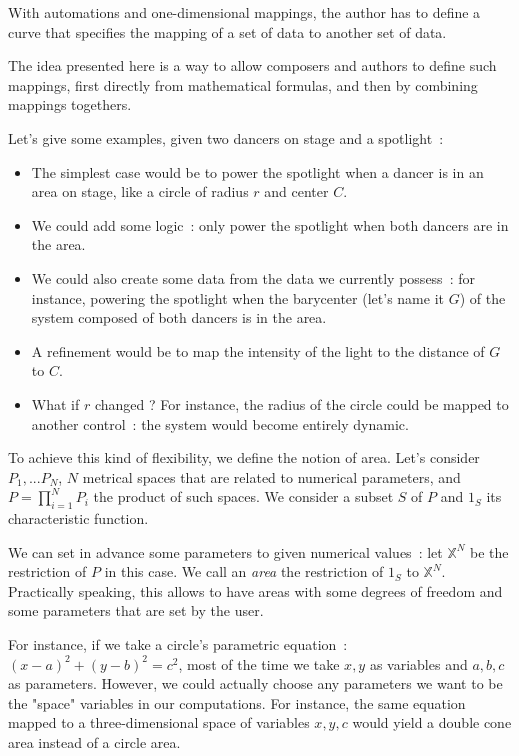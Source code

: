 \documentclass{sigchi}
\begin{document}
With automations and one-dimensional mappings, the author has to define a curve that specifies the mapping of a set of data to another set of data.

The idea presented here is a way to allow composers and authors to define such mappings, first directly from mathematical formulas, and then by combining mappings togethers.

Let's give some examples, given two dancers on stage and a spotlight~: 
\begin{itemize}
	\item The simplest case would be to power the spotlight when a dancer is in an area on stage, like a circle of radius $r$ and center $C$.
	\item We could add some logic~: only power the spotlight when both dancers are in the area.
	\item We could also create some data from the data we currently possess~: for instance, powering the spotlight when the barycenter (let's name it $G$) of the system composed of both dancers is in the area.
	\item A refinement would be to map the intensity of the light to the distance of $G$ to $C$.
	\item What if $r$ changed ? For instance, the radius of the circle could be mapped to another control~: the system would become entirely dynamic.
\end{itemize}

To achieve this kind of flexibility, we define the notion of area. Let's consider $P_1, ... P_N$, $N$ metrical spaces that are related to numerical parameters, and $P = \prod\limits^N_{i=1}P_i$ the product of such spaces. We consider a subset $S$ of $P$ and $1_S$ its characteristic function. 

We can set in advance some parameters to given numerical values~: let $\mathbb{X}^N$ be the restriction of $P$ in this case. We call an \textit{area} the restriction of $1_S$ to $\mathbb{X}^N$. Practically speaking, this allows to have areas with some degrees of freedom and some parameters that are set by the user.

For instance, if we take a circle's parametric equation~: $(x - a)^2 + (y - b)^2 = c^2$, most of the time we take $x, y$ as variables and $a, b, c$ as parameters. However, we could actually choose any parameters we want to be the "space" variables in our computations. For instance, the same equation mapped to a three-dimensional space of variables $x, y, c$ would yield a double cone area instead of a circle area.
\end{document}

